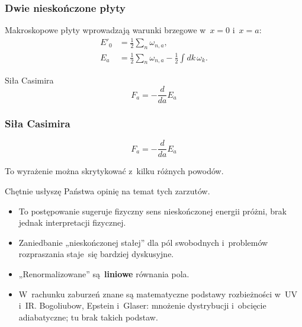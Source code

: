 \documentclass[10pt,t]{beamer}
\begin{document}
\begin{frame}
  \frametitle{Dwie nieskończone płyty}


  Makroskopowe płyty wprowadzają warunki brzegowe w~$x = 0$ i~$x = a$:
  \begin{subequations}
    \begin{align}
      \label{eq:Efekt-Casimira-04-A}
      E'_{ 0 }
      &= \frac{ 1 }{ 2 } \sum_{ n } \omega_{ n, a }, \\
      \label{eq:Efekt-Casimira-04-B}
      E_{ a }
      &=
        \frac{ 1 }{ 2 } \sum_{ n } \omega_{ n, a }
        - \frac{ 1 }{ 2 } \int dk \, \omega_{ k }.
    \end{align}
  \end{subequations}

  Siła Casimira
  \begin{equation}
    \label{eq:Efekt-Casimira-05}
    F_{ a } = -\frac{ d }{ da } E_{ a }
  \end{equation}

\end{frame}





\begin{frame}
  \frametitle{Siła Casimira}


  \begin{equation}
    \label{eq:Efekt-Casimira-06}
    F_{ a } = -\frac{ d }{ da } E_{ a }
  \end{equation}



  To wyrażenie można skrytykować z~kilku różnych powodów.

  Chętnie usłyszę Państwa opinię na temat tych zarzutów.
  \begin{itemize}
    \RaggedRight

  \item To postępowanie sugeruje fizyczny sens nieskończonej
    energii próżni, brak jednak interpretacji fizycznej.

  \item Zaniedbanie „nieskończonej stałej” dla pól swobodnych
    i~problemów rozpraszania staje~się bardziej dyskusyjne.

  \item „Renormalizowane” są~\textbf{liniowe} równania pola.

  \item W~rachunku zaburzeń znane są matematyczne podstawy
    rozbieżności w~UV i~IR. Bogoliubow, Epstein i~Glaser: mnożenie
    dystrybucji i~obcięcie adiabatyczne; tu brak takich podstaw.

  \end{itemize}

\end{frame}
\end{document}
